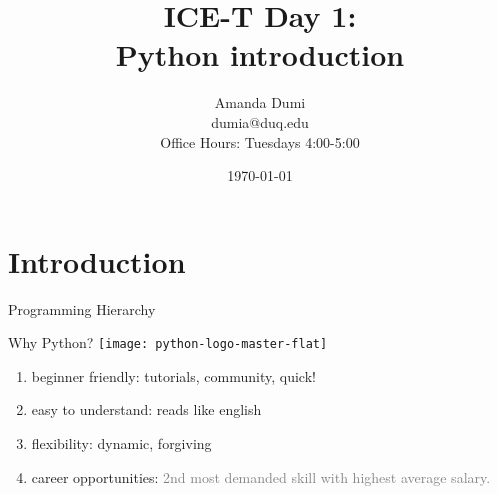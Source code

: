 \documentclass[xcolor=x11names,compress]{beamer}
\title[{\makebox[.5\paperwidth]{General Chemistry Recitation 1\hfill
       \insertframenumber/\inserttotalframenumber}}]{ICE-T Day 1:\\
Python introduction}
\author[\quad Amanda \quad\quad\quad\quad aed63@pitt.edu]{Amanda Dumi\\
dumia@duq.edu\\
Office Hours:
Tuesdays 4:00-5:00\\
}
\date{\small{\today}}
\renewcommand{\(}{\begin{columns}}
\renewcommand{\)}{\end{columns}}
\newcommand{\<}[1]{\begin{column}{#1}}
\renewcommand{\>}{\end{column}}
\begin{document}
\section{Introduction}
\begin{frame}
\titlepage
\end{frame}
\begin{frame}{Programming Hierarchy}
    \begin{center}
\end{center}
\end{frame}
    \begin{frame}{Why Python?}
\texttt{[image: python-logo-master-flat]}
\begin{enumerate}[label=$\bullet$]
\item<1-> \textcolor{darkcoral}{beginner friendly: } \textcolor<2->{gray!30}{tutorials, community, quick!}
\item<2-> \textcolor{darkcoral}{easy to understand:} \textcolor<3->{gray!30}{reads like english}
\item<3-> \textcolor{darkcoral}{flexibility:} \textcolor<4->{gray!30}{dynamic, forgiving}
\item<4-> \textcolor{darkcoral}{career opportunities:} \textcolor<5->{gray}{2nd most demanded skill with highest average salary.\autocite{http://www.bestprogramminglanguagefor.me/why-learn-python}}
\end{enumerate}
\end{frame}
\end{document}
